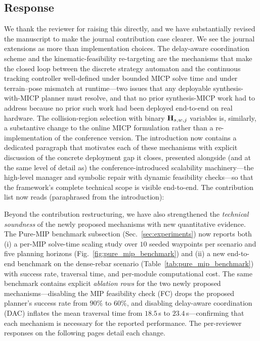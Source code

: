 \subsection{Response}
We thank the reviewer for raising this directly, and we have substantially revised the manuscript to make the journal contribution case clearer. We see the journal extensions as more than implementation choices. The delay-aware coordination scheme and the kinematic-feasibility re-targeting are the mechanisms that make the closed loop between the discrete strategy automaton and the continuous tracking controller well-defined under bounded MICP solve time and under terrain--pose mismatch at runtime---two issues that any deployable synthesis-with-MICP planner must resolve, and that no prior synthesis-MICP work had to address because no prior such work had been deployed end-to-end on real hardware. The collision-region selection with binary $\mathbf{H}_{s,w,j}$ variables is, similarly, a substantive change to the online MICP formulation rather than a re-implementation of the conference version. The introduction now contains a dedicated paragraph that motivates each of these mechanisms with explicit discussion of the concrete deployment gap it closes, presented alongside (and at the same level of detail as) the conference-introduced scalability machinery---the high-level manager and symbolic repair with dynamic feasibility checks---so that the framework's complete technical scope is visible end-to-end. The contribution list now reads (paraphrased from the introduction):

\textit{}

\noindent Beyond the contribution restructuring, we have also strengthened the \emph{technical soundness} of the newly proposed mechanisms with new quantitative evidence. The Pure-MIP benchmark subsection (Sec.~\ref{sec:experiments}) now reports both (i) a per-MIP solve-time scaling study over $10$ seeded waypoints per scenario and five planning horizons (Fig.~\ref{fig:pure_mip_benchmark}) and (ii) a new end-to-end benchmark on the dense-rebar scenario (Table~\ref{tab:pure_mip_benchmark}) with success rate, traversal time, and per-module computational cost. The same benchmark contains explicit \emph{ablation rows} for the two newly proposed mechanisms---disabling the MIP feasibility check (FC) drops the proposed planner's success rate from $90\%$ to $60\%$, and disabling delay-aware coordination (DAC) inflates the mean traversal time from $18.5$\,s to $23.4$\,s---confirming that each mechanism is necessary for the reported performance. The per-reviewer responses on the following pages detail each change.

